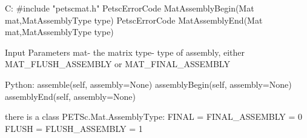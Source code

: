 C:
#include "petscmat.h"
PetscErrorCode MatAssemblyBegin(Mat mat,MatAssemblyType type)
PetscErrorCode MatAssemblyEnd(Mat mat,MatAssemblyType type)

Input Parameters
mat- the matrix
type- type of assembly, either MAT_FLUSH_ASSEMBLY
    or MAT_FINAL_ASSEMBLY

Python:
assemble(self, assembly=None)
assemblyBegin(self, assembly=None)
assemblyEnd(self, assembly=None)

there is a class PETSc.Mat.AssemblyType:
FINAL = FINAL_ASSEMBLY = 0
FLUSH = FLUSH_ASSEMBLY = 1
